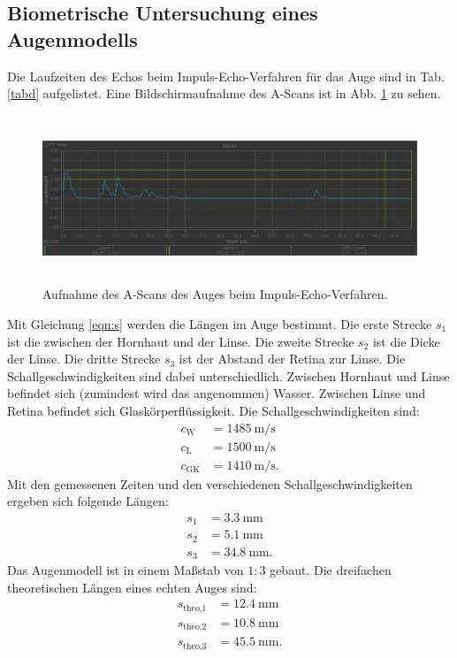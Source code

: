 \subsection{Biometrische Untersuchung eines Augenmodells}
Die Laufzeiten des Echos beim Impuls-Echo-Verfahren für das Auge
sind in Tab. \ref{tabd} aufgelistet. Eine Bildschirmaufnahme des
A-Scans ist in Abb. \ref{fig:auge} zu sehen.

\begin{figure}
 \centering
 \includegraphics[width=15cm, height=5cm]{build/Auge.png}
 \caption{Aufnahme des A-Scans des Auges beim Impuls-Echo-Verfahren.}
 \label{fig:auge}
\end{figure}
\noindent Mit Gleichung \eqref{eqn:s} werden die Längen im Auge bestimmt.
Die erste Strecke $s_1$ ist die zwischen der Hornhaut und der Linse.
Die zweite Strecke $s_2$ ist die Dicke der Linse. Die dritte Strecke $s_3$ ist der Abstand
der Retina zur Linse.
Die Schallgeschwindigkeiten sind dabei unterschiedlich.
Zwischen Hornhaut und Linse befindet sich (zumindest wird das angenommen)
Wasser. Zwischen Linse und Retina befindet sich Glaskörperflüssigkeit.
Die Schallgeschwindigkeiten \cite{c} \cite{US1} sind:
\begin{align*}
    c_{\text{W}} &= \SI{1485}{\meter\per\second} \\
    c_{\text{L}} &= \SI{1500}{\meter\per\second} \\
    c_{\text{GK}} &= \SI{1410}{\meter\per\second}.
\end{align*}
Mit den gemessenen Zeiten und den verschiedenen Schallgeschwindigkeiten
ergeben sich folgende Längen:
\begin{align*}
    s_1 &= \SI{3.3}{\milli\meter} \\
    s_2 &= \SI{5.1}{\milli\meter} \\
    s_3 &= \SI{34.8}{\milli\meter}.
\end{align*}
Das Augenmodell ist in einem Maßstab von $1:3$ gebaut.
Die dreifachen theoretischen Längen eines echten Auges \cite{auge} sind:
\begin{align*}
    s_{\text{theo,1}} &= \SI{12.4}{\milli\meter} \\
    s_{\text{theo,2}} &= \SI{10.8}{\milli\meter} \\
    s_{\text{theo,3}} &= \SI{45.5}{\milli\meter}.
\end{align*}
